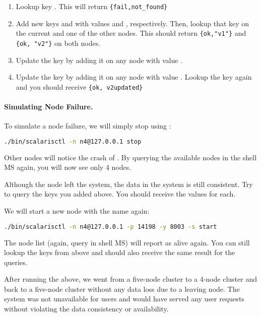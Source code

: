 \begin{enumerate}
    \item Lookup key . This will return \lstinline|{fail,not_found}|
    \item Add new keys  and  with values  and
      , respectively. Then, lookup that key on the current and one
      of the other nodes. This should return \lstinline|{ok,"v1"}| and
      \lstinline|{ok, "v2"}| on both nodes.
    \item Update the key  by adding it on any node with value
      .
    \item Update the key  by adding it on any node with value
      .  Lookup the key again and you should receive
      \lstinline|{ok, v2updated}|
\end{enumerate}

\paragraph{Simulating Node Failure.}
To simulate a node failure, we will simply stop  using
:

\begin{lstlisting}[language=sh]
./bin/scalarisctl -n n4@127.0.0.1 stop
\end{lstlisting}

Other nodes will notice the crash of . By querying the available
nodes in the shell MS again, you will now see only 4 nodes.

Although the node  left the system, the data in the system is still
consistent. Try to query the keys you added above. You should receive the
values for each.

We will start a new node with the name  again:
\begin{lstlisting}[language=sh]
./bin/scalarisctl -n n4@127.0.0.1 -p 14198 -y 8003 -s start
\end{lstlisting}

The node list (again, query  in shell MS) will report
 as alive again. You can still lookup the keys from above and
should also receive the same result for the queries.

After running the above, we went from a five-node cluster to a 4-node
cluster and back to a five-node cluster without any data loss due to a
leaving node. The system was not unavailable for users and would have served
any user requests without violating the data consistency or availability.

